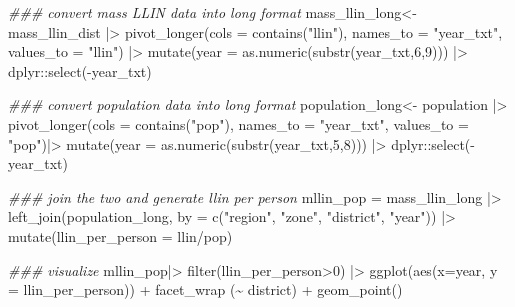 \documentclass[
  letterpaper,
  DIV=11,
  numbers=noendperiod]{scrreprt}
\newenvironment{Shaded}{\begin{snugshade}}{\end{snugshade}}
\newcommand{\AttributeTok}[1]{\textcolor[rgb]{0.40,0.45,0.13}{#1}}
\newcommand{\DecValTok}[1]{\textcolor[rgb]{0.68,0.00,0.00}{#1}}
\newcommand{\DocumentationTok}[1]{\textcolor[rgb]{0.37,0.37,0.37}{\textit{#1}}}
\newcommand{\FunctionTok}[1]{\textcolor[rgb]{0.28,0.35,0.67}{#1}}
\newcommand{\NormalTok}[1]{\textcolor[rgb]{0.00,0.23,0.31}{#1}}
\newcommand{\OtherTok}[1]{\textcolor[rgb]{0.00,0.23,0.31}{#1}}
\newcommand{\SpecialCharTok}[1]{\textcolor[rgb]{0.37,0.37,0.37}{#1}}
\newcommand{\StringTok}[1]{\textcolor[rgb]{0.13,0.47,0.30}{#1}}
\begin{document}
\begin{Shaded}
\begin{Highlighting}[]
\DocumentationTok{\#\#\# convert mass LLIN data into long format}
\NormalTok{mass\_llin\_long}\OtherTok{\textless{}{-}} 
\NormalTok{  mass\_llin\_dist }\SpecialCharTok{|\textgreater{}}
  \FunctionTok{pivot\_longer}\NormalTok{(}\AttributeTok{cols =} \FunctionTok{contains}\NormalTok{(}\StringTok{"llin"}\NormalTok{),}
               \AttributeTok{names\_to =} \StringTok{"year\_txt"}\NormalTok{, }
               \AttributeTok{values\_to =} \StringTok{"llin"}\NormalTok{) }\SpecialCharTok{|\textgreater{}}
  \FunctionTok{mutate}\NormalTok{(}\AttributeTok{year =} \FunctionTok{as.numeric}\NormalTok{(}\FunctionTok{substr}\NormalTok{(year\_txt,}\DecValTok{6}\NormalTok{,}\DecValTok{9}\NormalTok{))) }\SpecialCharTok{|\textgreater{}}
\NormalTok{  dplyr}\SpecialCharTok{::}\FunctionTok{select}\NormalTok{(}\SpecialCharTok{{-}}\NormalTok{year\_txt)}

\DocumentationTok{\#\#\# convert population data into long format}
\NormalTok{population\_long}\OtherTok{\textless{}{-}}\NormalTok{ population }\SpecialCharTok{|\textgreater{}}
  \FunctionTok{pivot\_longer}\NormalTok{(}\AttributeTok{cols =} \FunctionTok{contains}\NormalTok{(}\StringTok{"pop"}\NormalTok{),}
               \AttributeTok{names\_to =} \StringTok{"year\_txt"}\NormalTok{,}
               \AttributeTok{values\_to =} \StringTok{"pop"}\NormalTok{)}\SpecialCharTok{|\textgreater{}}
  \FunctionTok{mutate}\NormalTok{(}\AttributeTok{year =} \FunctionTok{as.numeric}\NormalTok{(}\FunctionTok{substr}\NormalTok{(year\_txt,}\DecValTok{5}\NormalTok{,}\DecValTok{8}\NormalTok{))) }\SpecialCharTok{|\textgreater{}}
\NormalTok{  dplyr}\SpecialCharTok{::}\FunctionTok{select}\NormalTok{(}\SpecialCharTok{{-}}\NormalTok{year\_txt)}

\DocumentationTok{\#\#\# join the two and generate llin per person}
\NormalTok{  mllin\_pop }\OtherTok{=}\NormalTok{ mass\_llin\_long }\SpecialCharTok{|\textgreater{}}
  \FunctionTok{left\_join}\NormalTok{(population\_long,}
            \AttributeTok{by =} \FunctionTok{c}\NormalTok{(}\StringTok{"region"}\NormalTok{,}
                   \StringTok{"zone"}\NormalTok{,}
                   \StringTok{"district"}\NormalTok{,}
                   \StringTok{"year"}\NormalTok{)) }\SpecialCharTok{|\textgreater{}}
    \FunctionTok{mutate}\NormalTok{(}\AttributeTok{llin\_per\_person  =}\NormalTok{ llin}\SpecialCharTok{/}\NormalTok{pop)}


\DocumentationTok{\#\#\# visualize}
\NormalTok{mllin\_pop}\SpecialCharTok{|\textgreater{}} 
    \FunctionTok{filter}\NormalTok{(llin\_per\_person}\SpecialCharTok{\textgreater{}}\DecValTok{0}\NormalTok{) }\SpecialCharTok{|\textgreater{}}
    \FunctionTok{ggplot}\NormalTok{(}\FunctionTok{aes}\NormalTok{(}\AttributeTok{x=}\NormalTok{year, }\AttributeTok{y =}\NormalTok{ llin\_per\_person)) }\SpecialCharTok{+}
    \FunctionTok{facet\_wrap}\NormalTok{ (}\SpecialCharTok{\textasciitilde{}}\NormalTok{ district) }\SpecialCharTok{+}
    \FunctionTok{geom\_point}\NormalTok{()}
\end{Highlighting}
\end{Shaded}
\end{document}
